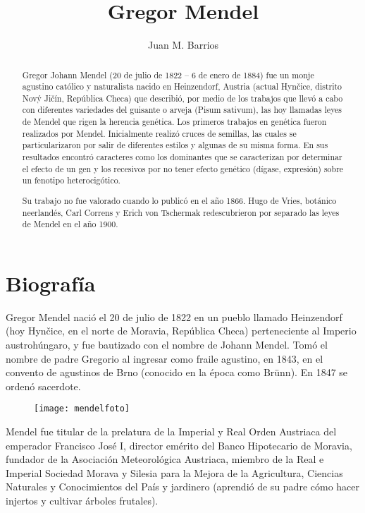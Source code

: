 \documentclass[letterpaper,12pt]{report}
\title{Gregor Mendel}
\author{Juan M. Barrios}
\begin{document}
\maketitle
\begin{abstract}
Gregor Johann Mendel (20 de julio de 1822 – 6 de enero de 1884) fue un monje agustino católico y naturalista nacido en Heinzendorf, Austria (actual Hynčice, distrito Nový Jičín, República Checa) que describió, por medio de los trabajos que llevó a cabo con diferentes variedades del guisante o arveja (Pisum sativum), las hoy llamadas leyes de Mendel que rigen la herencia genética. Los primeros trabajos en genética fueron realizados por Mendel. Inicialmente realizó cruces de semillas, las cuales se particularizaron por salir de diferentes estilos y algunas de su misma forma. En sus resultados encontró caracteres como los dominantes que se caracterizan por determinar el efecto de un gen y los recesivos por no tener efecto genético (dígase, expresión) sobre un fenotipo heterocigótico.

Su trabajo no fue valorado cuando lo publicó en el año 1866. Hugo de Vries, botánico neerlandés, Carl Correns y Erich von Tschermak redescubrieron por separado las leyes de Mendel en el año 1900.

\end{abstract}

\tableofcontents


\chapter{Biografía}

Gregor Mendel nació el 20 de julio de 1822 en un pueblo llamado Heinzendorf (hoy Hynčice, en el norte de Moravia, República Checa) perteneciente al Imperio austrohúngaro, y fue bautizado con el nombre de Johann Mendel. Tomó el nombre de padre Gregorio al ingresar como fraile agustino, en 1843, en el convento de agustinos de Brno (conocido en la época como Brünn). En 1847 se ordenó sacerdote.

\begin{figure}[h!]
\centering
\texttt{[image: mendelfoto]}
\end{figure}


Mendel fue titular de la prelatura de la Imperial y Real Orden Austriaca del emperador Francisco José I, director emérito del Banco Hipotecario de Moravia, fundador de la Asociación Meteorológica Austriaca, miembro de la Real e Imperial Sociedad Morava y Silesia para la Mejora de la Agricultura, Ciencias Naturales y Conocimientos del País y jardinero (aprendió de su padre cómo hacer injertos y cultivar árboles frutales).
\end{document}
